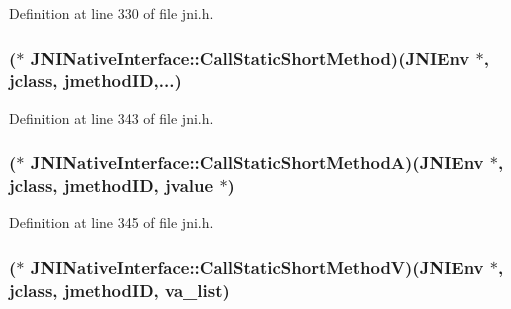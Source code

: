 Definition at line 330 of file jni.\-h.

\hypertarget{struct_j_n_i_native_interface_aaa2e5977b53bf76c9351e3aaa80bb0b3}{
\subsubsection[{Call\-Static\-Short\-Method}]{($\ast$ J\-N\-I\-Native\-Interface\-::\-Call\-Static\-Short\-Method)({\bf J\-N\-I\-Env} $\ast$, {\bf jclass}, {\bf jmethod\-I\-D},...)}}\label{struct_j_n_i_native_interface_aaa2e5977b53bf76c9351e3aaa80bb0b3}


Definition at line 343 of file jni.\-h.

\hypertarget{struct_j_n_i_native_interface_a1e762d4a56f8a13180ff43299c2efc37}{
\subsubsection[{Call\-Static\-Short\-Method\-A}]{($\ast$ J\-N\-I\-Native\-Interface\-::\-Call\-Static\-Short\-Method\-A)({\bf J\-N\-I\-Env} $\ast$, {\bf jclass}, {\bf jmethod\-I\-D}, {\bf jvalue} $\ast$)}}\label{struct_j_n_i_native_interface_a1e762d4a56f8a13180ff43299c2efc37}


Definition at line 345 of file jni.\-h.

\hypertarget{struct_j_n_i_native_interface_a3d7007ac49efcf561aba8ea0fc60b9c5}{
\subsubsection[{Call\-Static\-Short\-Method\-V}]{($\ast$ J\-N\-I\-Native\-Interface\-::\-Call\-Static\-Short\-Method\-V)({\bf J\-N\-I\-Env} $\ast$, {\bf jclass}, {\bf jmethod\-I\-D}, va\-\_\-list)}}\label{struct_j_n_i_native_interface_a3d7007ac49efcf561aba8ea0fc60b9c5}


